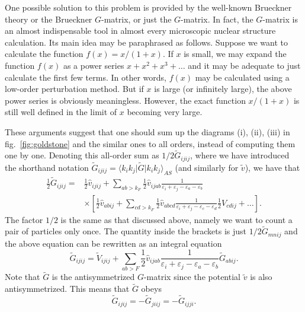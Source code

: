\documentclass[%
oneside,                 %
final,                   %
10pt]{article}
\begin{document}
One possible solution to  this problem is provided by the well-known
Brueckner theory or the Brueckner $G$-matrix, or just the
$G$-matrix. In fact, the $G$-matrix is an almost indispensable
tool in almost every microscopic nuclear structure
calculation. Its main idea may be paraphrased as follows.
Suppose we want to calculate the function $f(x)=x/(1+x)$. If
$x$ is small, we may expand the function $f(x)$ as a power series
$x+x^2+x^3+\dots$ and it may be adequate to just calculate the first
few terms. In other words, $f(x)$ may be calculated using a low-order
perturbation method. But if $x$ is large
(or infinitely large), the above
power series is obviously meaningless.
However, the exact function
$x/(1+x)$ is still well defined in the limit
of $x$ becoming very large.

These arguments suggest that one should sum up the diagrams
(i), (ii), (iii) in fig.~\ref{fig:goldstone} and the similar ones
to all orders, instead of computing them one by one. Denoting this
all-order sum as $1/2\tilde{G}_{ijij}$, where we have
introduced the shorthand notation
$\tilde{G}_{ijij}=\langle k_ik_j\vert \tilde{G}\vert k_ik_j\rangle_{AS}$
(and similarly for $\tilde{v}$),
we have that
\begin{align}
      \frac{1}{2}\tilde{G}_{ijij}=&\frac{1}{2}\hat{v}_{ijij}
      +\sum_{ab>k_F}\frac{1}{2}\hat{v}_{ijab}\frac{1}{\varepsilon_i+\varepsilon_j-\varepsilon_a-\varepsilon_b}
      \nonumber \\
      & \times\left[\frac{1}{2}\hat{v}_{abij}+\sum_{cd>k_F}
      \frac{1}{2}\hat{v}_{abcd}\frac{1}
      {\varepsilon_i+\varepsilon_j-\varepsilon_c-\varepsilon_d}
      \frac{1}{2}V_{cdij}+\dots  \right].
\end{align}
The factor $1/2$ is the same as that discussed above, namely we want 
to count a pair of particles only once.
The quantity inside the brackets is just
$1/2\tilde{G}_{mnij}$ and the above equation can be
rewritten as an integral equation
\begin{equation}
      \tilde{G}_{ijij}=\tilde{V}_{ijij}
      +\sum_{ab>F}\frac{1}{2}\hat{v}_{ijab}\frac{1}{\varepsilon_i+\varepsilon_j-\varepsilon_a-\varepsilon_b}
      \tilde{G}_{abij}.
\end{equation}
Note that $\tilde{G}$ is the antisymmetrized $G$-matrix since
the potential $\tilde{v}$ is also antisymmetrized. This means that
$\tilde{G}$ obeys
\begin{equation}
  \tilde{G}_{ijij}=-\tilde{G}_{jiij}=-\tilde{G}_{ijji}.
\end{equation}
\end{document}
